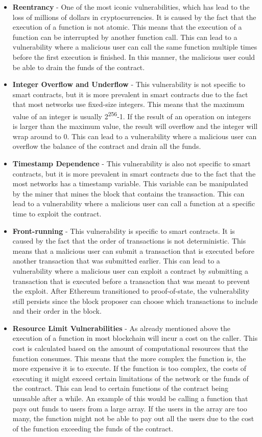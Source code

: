 \begin{itemize}
    \item \textbf{Reentrancy} - One of the most iconic vulnerabilities, which has lead to the loss of millions of dollars in cryptocurrencies. It is caused by the fact that the execution of a function is not atomic. This means that the execution of a function can be interrupted by another function call. This can lead to a vulnerability where a malicious user can call the same function multiple times before the first execution is finished. In this manner, the malicious user could be able to drain the funds of the contract.
    \item \textbf{Integer Overflow and Underflow} - This vulnerability is not specific to smart contracts, but it is more prevalent in smart contracts due to the fact that most networks use fixed-size integers. This means that the maximum value of an integer is usually 2\textsuperscript{256}-1. If the result of an operation on integers is larger than the maximum value, the result will overflow and the integer will wrap around to 0. This can lead to a vulnerability where a malicious user can overflow the balance of the contract and drain all the funds.
    \item \textbf{Timestamp Dependence} - This vulnerability is also not specific to smart contracts, but it is more prevalent in smart contracts due to the fact that the most networks has a timestamp variable. This variable can be manipulated by the miner that mines the block that contains the transaction. This can lead to a vulnerability where a malicious user can call a function at a specific time to exploit the contract.
    \item \textbf{Front-running} - This vulnerability is specific to smart contracts. It is caused by the fact that the order of transactions is not deterministic. This means that a malicious user can submit a transaction that is executed before another transaction that was submitted earlier. This can lead to a vulnerability where a malicious user can exploit a contract by submitting a transaction that is executed before a transaction that was meant to prevent the exploit. After Ethereum transitioned to proof-of-state, the vulnerability still persists since the block proposer can choose which transactions to include and their order in the block.
    \item \textbf{Resource Limit Vulnerabilities} - As already mentioned above the execution of a function in most blockchain will incur a cost on the caller. This cost is calculated based on the amount of computational resources that the function consumes. This means that the more complex the function is, the more expensive it is to execute. If the function is too complex, the costs of executing it might exceed certain limitations of the network or the funds of the contract. This can lead to certain functions of the contract being unusable after a while. An example of this would be calling a function that pays out funds to users from a large array. If the users in the array are too many, the function might not be able to pay out all the users due to the cost of the function exceeding the funds of the contract.

\end{itemize}
